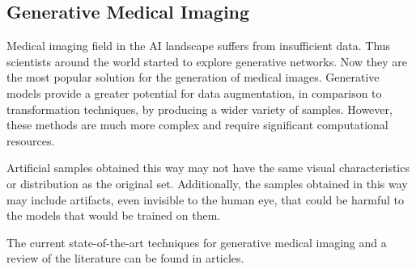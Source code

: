 


\subsection{Generative Medical Imaging}
Medical imaging field in the AI landscape suffers from insufficient data. Thus scientists around the world started to explore generative networks. Now they are the most popular solution for the generation of medical images\cite{osuala2023data}.
Generative models provide a greater potential for data augmentation, in comparison to transformation techniques, by producing a wider variety of samples. However, these methods are much more complex and require significant computational resources.

Artificial samples obtained this way may not have the same visual characteristics or distribution as the original set. Additionally, the samples obtained in this way may include artifacts, even invisible to the human eye, that could be harmful to the models that would be trained on them. 

The current state-of-the-art techniques for generative medical imaging and a review of the literature can be found in articles\cite{GARCEA2023106391}\cite{OSUALA2023102704}.

